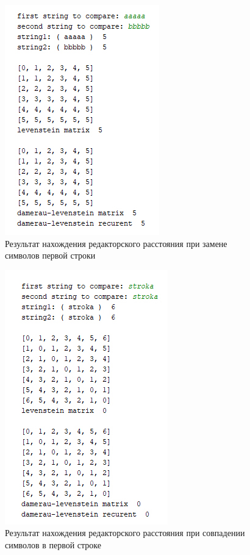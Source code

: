 \documentclass[a4paper,12pt]{report}
\begin{document}
\begin{center}
    	\newpage
    	\begin{figure}[h!]
    		\includegraphics[width=0.6\linewidth]{test4.jpg}
    		\caption{Результат нахождения редакторского расстояния при замене символов первой строки}
    		\label{ris:test3}
    	\end{figure}
    
    	\newpage
    	\begin{figure}[h!]
    		\includegraphics[width=0.6\linewidth]{test3.jpg}
    		\caption{Результат нахождения редакторского расстояния при совпадении символов в первой строке}
    		\label{ris:test4}
    	\end{figure}
    

\end{center}
\end{document}

